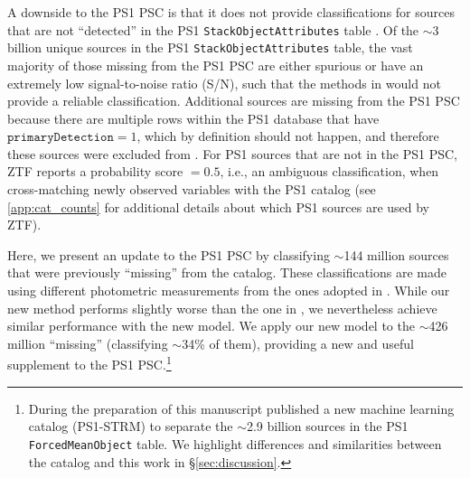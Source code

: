 \documentclass[twocolumn]{aastex63}
\begin{document}
A downside to the PS1 PSC is that it does not provide classifications for
sources that are not ``detected'' in the PS1 \texttt{StackObjectAttributes}
table \citep[the definition of a PS1 stack ``detection'' is given
in][]{Tachibana18}. Of the $\sim$3 billion unique sources in the PS1
\texttt{StackObjectAttributes} table, the vast majority of those missing from
the PS1 PSC are either spurious or have an extremely low signal-to-noise ratio
(S/N), such that the methods in \citet{Tachibana18} would not provide a
reliable classification. 
Additional sources are missing from the PS1 PSC because there are multiple
rows within the PS1 database that have $\mathtt{primaryDetection} = 1$, which
by definition should not happen, and therefore these sources were excluded
from \citet{Tachibana18}. For PS1 sources that are not in the PS1 PSC, ZTF
reports a probability score $=0.5$, i.e., an ambiguous classification, when
cross-matching newly observed variables with the PS1 catalog (see
\ref{app:cat_counts} for additional details about which PS1 sources are used
by ZTF).

Here, we present an update to the PS1 PSC by classifying $\sim$144 million
sources that were previously ``missing'' from the catalog. These
classifications are made using different photometric measurements from the
ones adopted in \citet{Tachibana18}. While our new method performs slightly
worse than the one in \citet{Tachibana18}, we nevertheless achieve similar
performance with the new model. We apply our new model to the $\sim$426
million ``missing'' (classifying $\sim$34\% of them), providing a new and
useful supplement to the PS1 PSC.\footnote{During the preparation of this
manuscript \citet{Beck20} published a new machine learning catalog (PS1-STRM)
to separate the $\sim$2.9 billion sources in the PS1 \texttt{ForcedMeanObject}
table. We highlight differences and similarities between the
\citeauthor{Beck20} catalog and this work in \S\ref{sec:discussion}.}
\end{document}

